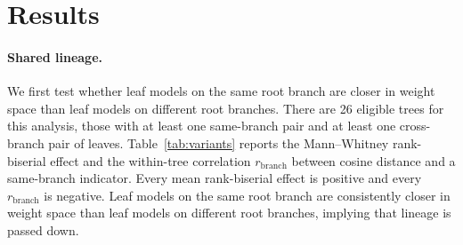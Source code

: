 \documentclass{article}
\theoremstyle{definition}
\theoremstyle{plain}
\begin{document}
\section{Results}
\label{sec:results}


\paragraph{Shared lineage.}
We first test whether leaf models on the same root branch are closer in weight space than leaf models on different root branches. There are 26 eligible trees for this analysis, those with at least one same-branch pair and at least one cross-branch pair of leaves. Table~\ref{tab:variants} reports the Mann--Whitney rank-biserial effect and the within-tree correlation $r_{\mathrm{branch}}$ between cosine distance and a same-branch indicator. Every mean rank-biserial effect is positive and every $r_{\mathrm{branch}}$ is negative. Leaf models on the same root branch are consistently closer in weight space than leaf models on different root branches, implying that lineage is passed down.
\end{document}
